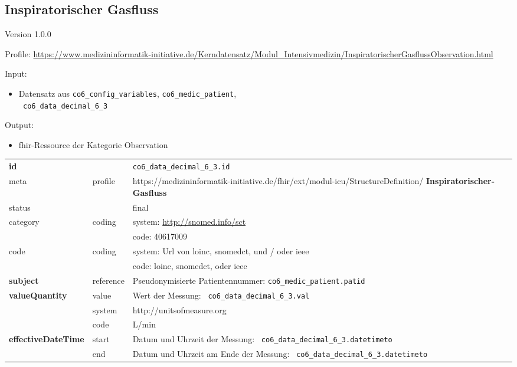 \subsection{Inspiratorischer Gasfluss} 
\noindent Version 1.0.0

\noindent Profile: \url{https://www.medizininformatik-initiative.de/Kerndatensatz/Modul_Intensivmedizin/InspiratorischerGasflussObservation.html}

\noindent Input:
\begin{itemize}
	\item Datensatz aus \texttt{co6\_config\_variables}, \texttt{co6\_medic\_patient}, \\ \texttt{
co6\_data\_decimal\_6\_3}
\end{itemize}
Output:
\begin{itemize}
        \item \ac{fhir}-Ressource der Kategorie \glqq Observation\grqq{}
\end{itemize}
\begin{longtable}{|l|l|p{7.5cm}|}
        \hline
        \rowcolor{lightgray} \multicolumn{3}{|l|}{Data Mapping (inhaltlich)} \\ \hline
        \textbf{id} &  & \texttt{co6\_data\_decimal\_6\_3.id} \\ \hline
	meta & profile & https://medizininformatik-initiative.de/fhir/ext/modul-icu/StructureDefinition/\textbf{
Inspiratorischer-Gasfluss} \\ \hline 
	status &  & final   \\ \hline 
	category & coding & system: \url{http://snomed.info/sct} \\
\cline{3-3}
	& & code: 40617009 \\ \hline
	code & coding & system: Url von \ac{loinc}, \ac{snomedct}, und / oder \ac{ieee} \\ 
	\cline{3-3} 
	 &  & code: \ac{loinc}, \ac{snomedct}, oder \ac{ieee} \\ \hline
	 \textbf{subject}  & reference & Pseudonymisierte Patientennummer: \texttt{co6\_medic\_patient.patid} \\ \hline
	 \textbf{valueQuantity}  & value & Wert der Messung: \texttt{
co6\_data\_decimal\_6\_3.val} \\
        \cline{2-3}
         & system & http://unitsofmeasure.org \\
         \cline{2-3}
         & code & L/min
\\ \hline
     \textbf{effectiveDateTime}  & start & Datum und Uhrzeit der Messung: \texttt{
co6\_data\_decimal\_6\_3.datetimeto} \\
    \cline{2-3}
     & end & Datum und Uhrzeit am Ende der Messung: \texttt{
co6\_data\_decimal\_6\_3.datetimeto} \\ \hline
\end{longtable}


